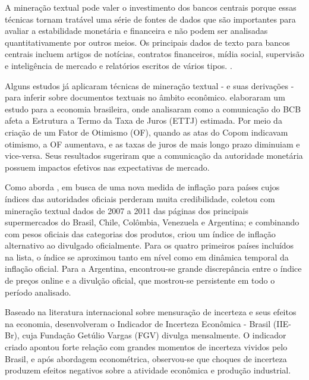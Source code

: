 \begin{citacao}

A mineração textual pode valer o investimento dos bancos centrais porque essas técnicas tornam tratável uma série de fontes de dados que são importantes para avaliar a estabilidade monetária e financeira e não podem ser analisadas quantitativamente por outros meios. Os principais dados de texto para bancos centrais incluem artigos de notícias, contratos financeiros, mídia social, supervisão e inteligência de mercado e relatórios escritos de vários tipos. \cite{bholat_etal2015}.

\end{citacao}

Alguns estudos já aplicaram técnicas de mineração textual - e suas derivações - para inferir sobre documentos textuais no âmbito econômico.  elaboraram um estudo para a economia brasileira, onde analisaram como a comunicação do BCB afeta a Estrutura a Termo da Taxa de Juros (ETTJ) estimada. Por meio da criação de um Fator de Otimismo (OF), quando as atas do Copom indicavam otimismo, a OF aumentava, e as taxas de juros de mais longo prazo diminuiam e vice-versa. Seus resultados sugeriram que a comunicação da autoridade monetária possuem impactos efetivos nas expectativas de mercado.

Como aborda , em busca de uma nova medida de inflação para países cujos índices das autoridades oficiais perderam muita credibilidade,  coletou com mineração textual dados de 2007 a 2011 das páginas dos principais supermercados do Brasil, Chile, Colômbia, Venezuela e Argentina; e combinando com pesos oficiais das categorias dos produtos, criou um índice de inflação alternativo ao divulgado oficialmente. Para os quatro primeiros países incluídos na lista, o índice se aproximou tanto em nível como em dinâmica temporal da inflação oficial. Para a Argentina, encontrou-se grande discrepância entre o índice de preços online e a divulção oficial, que mostrou-se persistente em todo o período analisado.

Baseado na literatura internacional sobre mensuração de incerteza e seus efeitos na economia,  desenvolveram o Indicador de Incerteza Econômica - Brasil (IIE-Br), cuja Fundação Getúlio Vargas (FGV) divulga mensalmente. O indicador criado apontou forte relação com grandes momentos de incerteza vividos pelo Brasil, e após abordagem econométrica, observou-se que choques de incerteza produzem efeitos negativos sobre a atividade econômica e produção industrial.

